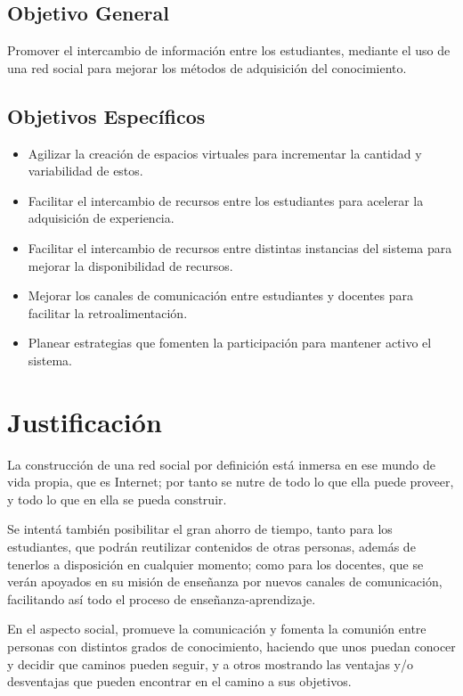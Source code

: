 \subsection{Objetivo General}
Promover el intercambio de información entre los estudiantes, mediante el uso de una red social para mejorar los métodos de adquisición del conocimiento.

\subsection{Objetivos Específicos}
\begin{itemize}
\item Agilizar la creación de espacios virtuales para incrementar la cantidad y variabilidad de estos.
\item Facilitar el intercambio de recursos entre los estudiantes para acelerar la adquisición de experiencia.
\item Facilitar el intercambio de recursos entre distintas instancias del sistema para mejorar la disponibilidad de recursos.
\item Mejorar los canales de comunicación entre estudiantes y docentes para facilitar la retroalimentación.
\item Planear estrategias que fomenten la participación para mantener activo el sistema.
\end{itemize}

\section{Justificación}
La construcción de una red social por definición está inmersa en ese mundo de vida propia, que es Internet; por tanto se nutre de todo lo que ella puede proveer, y todo lo que en ella se pueda construir.

Se intentá también posibilitar el gran ahorro de tiempo, tanto para los estudiantes, que podrán reutilizar contenidos de otras personas, además de tenerlos a disposición en cualquier momento; como para los docentes, que se verán apoyados en su misión de enseñanza por nuevos canales de comunicación, facilitando así todo el proceso de enseñanza-aprendizaje.

En el aspecto social, promueve la comunicación y fomenta la comunión entre personas con distintos grados de conocimiento, haciendo que unos puedan conocer y decidir que caminos pueden seguir, y a otros mostrando las ventajas y/o desventajas que pueden encontrar en el camino a sus objetivos.

